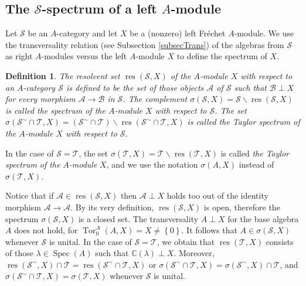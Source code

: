 \documentclass[12pt]{amsart}%
\theoremstyle{plain}
\newtheorem{definition}{Definition}
\numberwithin{equation}{section}
\numberwithin{equation}{section}
\numberwithin{theorem}{section}
\numberwithin{lemma}{section}
\numberwithin{remark}{section}
\numberwithin{example}{section}
\numberwithin{proposition}{section}
\numberwithin{definition}{section}
\numberwithin{corollary}{section}
\begin{document}
\subsection{The $\mathcal{S}$-spectrum of a left $A$-module\label{subsecSSA}}

Let $\mathcal{S}$ be an $A$-category and let $X$ be a (nonzero) left
Fr\'{e}chet $A$-module. We use the transversality relation (see Subsection
\ref{subsecTrans}) of the algebras from $\mathcal{S}$ as right $A$-modules
versus the left $A$-module $X$ to define the spectrum of $X$.

\begin{definition}
\label{def11}The \textit{resolvent set} $\operatorname{res}\left(
\mathcal{S},X\right)  $ \textit{of the }$A$\textit{-module }$X$\textit{ with
respect to an }$A$-\textit{category }$\mathcal{S}$ is defined to be the set of
those objects $\mathcal{A}$ of $\mathcal{S}$ such that $\mathcal{B}\perp X$
for every morphism $\mathcal{A\rightarrow B}$ in $\mathcal{S}$. The complement
$\sigma\left(  \mathcal{S},X\right)  =\mathcal{S}\backslash\operatorname{res}%
\left(  \mathcal{S},X\right)  $ is called \textit{the spectrum of the }%
$A$\textit{-module} $X$\textit{ with respect to} $\mathcal{S}$. The set
$\sigma\left(  \mathcal{S}^{\sim}\cap\mathcal{T},X\right)  =\left(
\mathcal{S}^{\sim}\cap\mathcal{T}\right)  \backslash\operatorname{res}\left(
\mathcal{S}^{\sim}\cap\mathcal{T},X\right)  $ is called \textit{the Taylor
spectrum of} \textit{the }$A$\textit{-module} $X$\textit{ with respect to}
$\mathcal{S}$.
\end{definition}

In the case of $\mathcal{S=T}$, the set $\sigma\left(  \mathcal{T},X\right)
=\mathcal{T}\backslash\operatorname{res}\left(  \mathcal{T},X\right)  $ is
called \textit{the Taylor spectrum of the }$A$\textit{-module} $X$, and we use
the notation $\sigma\left(  A,X\right)  $ instead of $\sigma\left(
\mathcal{T},X\right)  $.

Notice that if $\mathcal{A\in}\operatorname{res}\left(  \mathcal{S},X\right)
$ then $\mathcal{A}\perp X$ holds too out of the identity morphism
$\mathcal{A\rightarrow A}$. By its very definition, $\operatorname{res}\left(
\mathcal{S},X\right)  $ is open, therefore the spectrum $\sigma\left(
\mathcal{S},X\right)  $ is a closed set. The transversality $A\perp X$ for the
base algebra $A$ does not hold, for $\operatorname{Tor}_{0}^{A}\left(
A,X\right)  =X\neq\left\{  0\right\}  $. It follows that $A\in\sigma\left(
\mathcal{S},X\right)  $ whenever $\mathcal{S}$ is unital. In the case of
$\mathcal{S=T}$, we obtain that $\operatorname{res}\left(  \mathcal{T}%
,X\right)  $ consists of those $\lambda\in\operatorname{Spec}\left(  A\right)
$ such that $\mathbb{C}\left(  \lambda\right)  \perp X$. Moreover,
$\operatorname{res}\left(  \mathcal{S}^{\sim},X\right)  \cap\mathcal{T}%
=\operatorname{res}\left(  \mathcal{S}^{\sim}\cap\mathcal{T},X\right)  $ or
$\sigma\left(  \mathcal{S}^{\sim}\cap\mathcal{T},X\right)  =\sigma\left(
\mathcal{S}^{\sim},X\right)  \cap\mathcal{T}$, and $\sigma\left(
\mathcal{S}^{\sim}\cap\mathcal{T},X\right)  =\sigma\left(  \mathcal{T}%
,X\right)  $ whenever $\mathcal{S}$ is unital.
\end{document}
